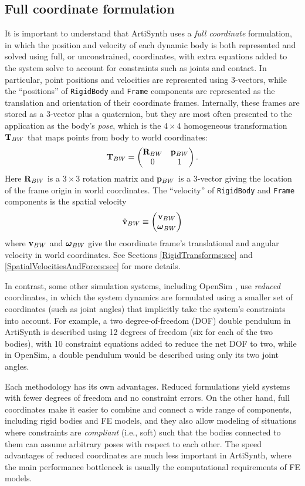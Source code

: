 \subsection{Full coordinate formulation}

It is important to understand that ArtiSynth uses a {\it full coordinate}
formulation, in which the position and velocity of each dynamic body is both
represented and solved using full, or unconstrained, coordinates, with extra
equations added to the system solve to account for constraints such as joints
and contact. In particular, point positions and velocities are represented
using 3-vectors, while the ``positions'' of {\tt RigidBody} and {\tt Frame}
components are represented as the translation and orientation of their
coordinate frames.  Internally, these frames are stored as a 3-vector plus a
quaternion, but they are most often presented to the application as the body's
{\it pose}, which is the $4 \times 4$ homogeneous transformation ${\bf T}_{BW}$ that
maps points from body to world coordinates:
%
\begin{equation*}
{\bf T}_{BW} =
\left(\begin{matrix}
{\bf R}_{BW} & {\bf p}_{BW} \\
0 & 1
\end{matrix}\right).
\end{equation*}
%
Here ${\bf R}_{BW}$ is a $3 \times 3$ rotation matrix and ${\bf p}_{BW}$ is a 3-vector
giving the location of the frame origin in world coordinates. The ``velocity''
of {\tt RigidBody} and {\tt Frame} components is the spatial velocity
%
\begin{equation*}
\hat{{\bf v}}_{BW} \equiv \left(\begin{matrix} {\bf v}_{BW} \\ \boldsymbol\omega_{BW} \end{matrix}\right)
\end{equation*}
%
where ${\bf v}_{BW}$ and $\boldsymbol\omega_{BW}$ give the coordinate frame's translational and
angular velocity in world coordinates.  See Sections \ref{RigidTransforms:sec}
and \ref{SpatialVelocitiesAndForces:sec} for more details.

In contrast, some other simulation systems, including OpenSim
\cite{delp2007opensim}, use {\it reduced} coordinates, in which the system
dynamics are formulated using a smaller set of coordinates (such as joint
angles) that implicitly take the system's constraints into account.  For
example, a two degree-of-freedom (DOF) double pendulum in ArtiSynth is
described using 12 degrees of freedom (six for each of the two bodies), with 10
constraint equations added to reduce the net DOF to two, while in OpenSim, a
double pendulum would be described using only its two joint angles.

Each methodology has its own advantages. Reduced formulations yield systems
with fewer degrees of freedom and no constraint errors. On the other hand, full
coordinates make it easier to combine and connect a wide range of components,
including rigid bodies and FE models, and they also allow modeling of
situations where constraints are {\it compliant} (i.e., soft) such that the
bodies connected to them can assume arbitrary poses with respect to each
other. The speed advantages of reduced coordinates are much less important in
ArtiSynth, where the main performance bottleneck is usually the computational
requirements of FE models.

